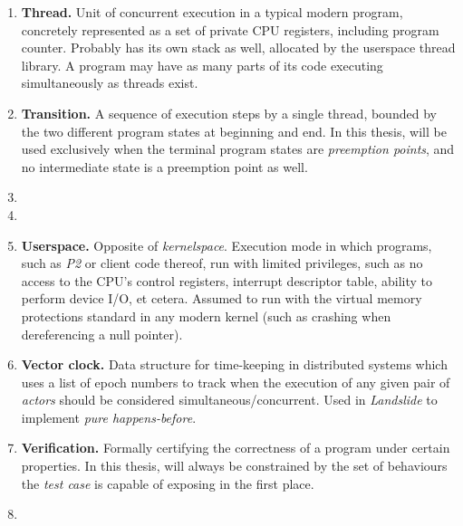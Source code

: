 \begin{enumerate}
	\item {\bf Thread.}
		Unit of concurrent execution in a typical modern program,
		concretely represented as a set of private CPU registers, including program counter.
		Probably has its own stack as well, allocated by the userspace thread library.
		A program may have as many parts of its code executing simultaneously as threads exist.
	\item {\bf Transition.}
		A sequence of execution steps by a single thread,
		bounded by the two different program states at beginning and end.
		In this thesis, will be used exclusively when the terminal program states are {\em preemption points},
		and no intermediate state is a preemption point as well.
	\item {}
	\item {}
	\item {\bf Userspace.}
		Opposite of {\em kernelspace}.
		Execution mode in which programs, such as {\em P2} or client code thereof,
		run with limited privileges,
		such as no access to the CPU's control registers, interrupt descriptor table, ability to perform device I/O,
		et cetera.
		Assumed to run with the virtual memory protections standard in any modern kernel
		(such as crashing when dereferencing a null pointer).
	\item {\bf Vector clock.}
		Data structure for time-keeping in distributed systems which uses a list of epoch numbers
		to track when the execution of any given pair of {\em actors} should be considered simultaneous/concurrent.
		Used in {\em Landslide} to implement {\em pure happens-before}.
	\item {\bf Verification.}
		Formally certifying the correctness of a program under certain properties.
		In this thesis, will always be constrained by the set of behaviours
		the {\em test case} is capable of exposing in the first place.
	\item {}
\end{enumerate}
